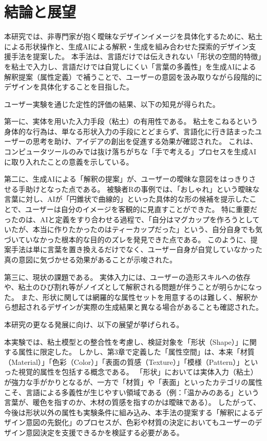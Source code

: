 \documentclass{kuisthesis}
\begin{document}
\section{結論と展望}

本研究では、非専門家が抱く曖昧なデザインイメージを具体化するために、粘土による形状操作と、生成AIによる解釈・生成を組み合わせた探索的デザイン支援手法を提案した。
本手法は、言語だけでは伝えきれない「形状の空間的特徴」を粘土で入力し、言語だけでは自覚しにくい「言葉の多義性」を生成AIによる解釈提案（属性定義）で補うことで、ユーザーの意図を汲み取りながら段階的にデザインを具体化することを目指した。

ユーザー実験を通じた定性的評価の結果、以下の知見が得られた。

第一に、実体を用いた入力手段（粘土）の有用性である。
粘土をこねるという身体的な行為は、単なる形状入力の手段にとどまらず、言語化に行き詰まったユーザーの思考を助け、アイデアの創出を促進する効果が確認された。
これは、コンピュータツールのみでは抜け落ちがちな「手で考える」プロセスを生成AIに取り入れたことの意義を示している。

第二に、生成AIによる「解釈の提案」が、ユーザーの曖昧な意図をはっきりさせる手助けとなった点である。 
被験者Rの事例では、「おしゃれ」という曖昧な言葉に対し、AIが「円錐状で曲線的」といった具体的な形の候補を提示したことで、ユーザーは自分のイメージを客観的に見直すことができた。 
特に重要だったのは、AIと定義をすり合わせる過程で、「自分はマグカップを作ろうとしていたが、本当に作りたかったのはティーカップだった」という、自分自身でも気づいていなかった根本的な目的のズレを発見できた点である。 
このように、提案手法は単に言葉を置き換えるだけでなく、ユーザー自身が自覚していなかった真の意図に気づかせる効果があることが示唆された。

第三に、現状の課題である。
実体入力には、ユーザーの造形スキルへの依存や、粘土のひび割れ等がノイズとして解釈される問題が伴うことが明らかになった。
また、形状に関しては網羅的な属性セットを用意するのは難しく、解釈から想起されるデザインが実際の生成結果と異なる場合があることも確認された。


本研究の更なる発展に向け、以下の展望が挙げられる。


本実験では、粘土模型との整合性を考慮し、検証対象を「形状（Shape）」に関する属性に限定した。
しかし、第3章で定義した「属性空間」は、本来「材質（Material）」「色彩（Color）」「表面の質感（Texture）」「模様（Pattern）」といった視覚的属性を包括する概念である。
「形状」においては実体入力（粘土）が強力な手がかりとなるが、一方で「材質」や「表面」といったカテゴリの属性こそ、言語による多義性が生じやすい領域である（例：「温かみのある」という言葉が、暖色を指すのか、木材の質感を指すのかは曖昧である）。
したがって、今後は形状以外の属性も実験条件に組み込み、本手法の提案する「解釈によるデザイン意図の先鋭化」のプロセスが、色彩や材質の決定においてもユーザーのデザイン意図決定を支援できるかを検証する必要がある。
\end{document}
